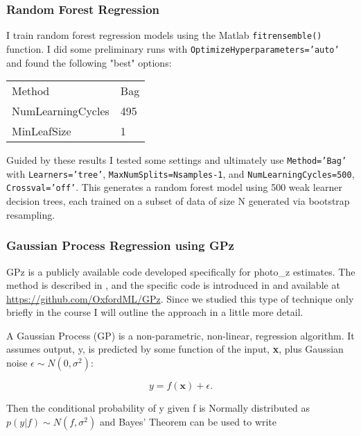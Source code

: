 \documentclass[13pt]{amsart}
\newcommand{\bx}{\textbf{x}}
\newcommand{\equ}[1]{\[#1\]}
\newcommand{\equin}[1]{\(#1\)}
\begin{document}
    \subsubsection{Random Forest Regression}

      I train random forest regression models using the Matlab \texttt{fitrensemble()} function. I did some preliminary runs with \texttt{OptimizeHyperparameters='auto'} and found the following "best" options:

        \begin{table}[H]
        \begin{tabular}{ll}
          Method            & Bag \\
          NumLearningCycles & 495 \\
          MinLeafSize       & 1
        \end{tabular}
        \end{table}

        Guided by these results I tested some settings and ultimately use \texttt{Method='Bag'} with \texttt{Learners='tree'}, \texttt{MaxNumSplits=Nsamples-1}, and \texttt{NumLearningCycles=500}, \texttt{Crossval='off'}. This generates a random forest model using 500 weak learner decision trees, each trained on a subset of data of size N generated via bootstrap resampling.



    \subsubsection{Gaussian Process Regression using GPz}
      \label{gpz}

      GPz is a publicly available code developed specifically for photo\_z estimates. The method is described in \cite{sgp}, and the specific code is introduced in \cite{gpz} and available at \url{https://github.com/OxfordML/GPz}. Since we studied this type of technique only briefly in the course I will outline the approach in a little more detail.

      A Gaussian Process (GP) is a non-parametric, non-linear, regression algorithm. It assumes output, y, is predicted by some function of the input, \bx, plus Gaussian noise \equin{\epsilon \sim N(0,\sigma^2)}:

      \equ{y = f(\bx)+ \epsilon.}

      Then the conditional probability of y given f is Normally distributed as
      \equin{p(y|f) \sim N(f,\sigma^2)} and Bayes' Theorem can be used to write
\end{document}
